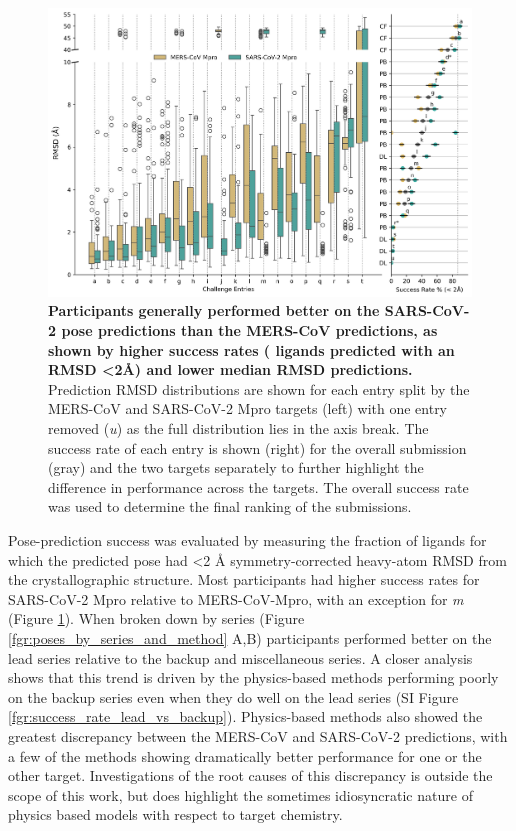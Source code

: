 \documentclass[journal=jcim,manuscript=article]{achemso}
\begin{document}
\begin{figure}
    \includegraphics[width=6in
    ]{04_figs_leaderboards/pose_comp.png}
  \caption{\textbf{Participants generally performed better on the SARS-CoV-2 pose predictions than the MERS-CoV predictions, as shown by higher success rates ( ligands predicted with an RMSD \textless2Å) and lower median RMSD predictions.} Prediction RMSD distributions are shown for each entry split by the MERS-CoV and SARS-CoV-2 Mpro targets (left) with one entry removed (\textit{u}) as the full distribution lies in the axis break. The success rate of each entry is shown (right) for the overall submission (gray) and the two targets separately to further highlight the difference in performance across the targets. The overall success rate was used to determine the final ranking of the submissions.}
  \label{fgr:poses_leaderboard}
\end{figure}

Pose-prediction success was evaluated by measuring the fraction of ligands for which the predicted pose had \textless 2 Å symmetry-corrected heavy-atom RMSD from the crystallographic structure. Most participants had higher success rates for SARS-CoV-2 Mpro relative to MERS-CoV-Mpro, with an exception for \textit{m} (Figure \ref{fgr:poses_leaderboard}). When broken down by series (Figure \ref{fgr:poses_by_series_and_method} A,B) participants performed better on the lead series relative to the backup and miscellaneous series. A closer analysis shows that this trend is driven by the physics-based methods performing poorly on the backup series even when they do well on the lead series (SI Figure \ref{fgr:success_rate_lead_vs_backup}). Physics-based methods also showed the greatest discrepancy between the MERS-CoV and SARS-CoV-2 predictions, with a few of the methods showing dramatically better performance for one or the other target. Investigations of the root causes of this discrepancy is outside the scope of this work, but does highlight the sometimes idiosyncratic nature of physics based models with respect to target chemistry. 
\end{document}
